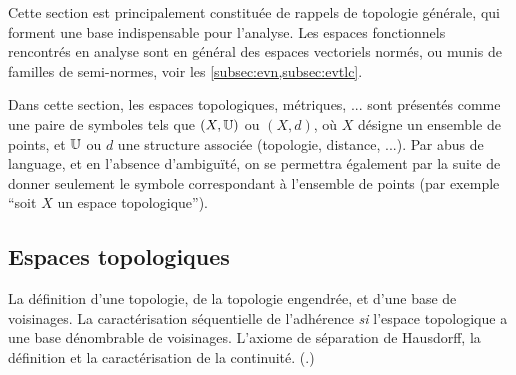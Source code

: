 Cette section est principalement constituée de rappels de topologie générale, qui forment une base indispensable pour l'analyse. Les espaces fonctionnels rencontrés en analyse sont en général des espaces vectoriels normés, ou munis de familles de semi-normes, voir les \cref{subsec:evn,subsec:evtlc}.


\begin{remark}
	Dans cette section, les espaces topologiques, métriques, ... sont présentés comme une paire de symboles tels que $(X,\mathbb{U})$ ou $(X,d)$, où $X$ désigne un ensemble de points, et $\mathbb{U}$ ou $d$ une structure associée (topologie, distance, ...). Par abus de language, et en l'absence d'ambiguïté, on se permettra également par la suite de donner seulement le symbole correspondant à l'ensemble de points (par exemple ``soit $X$ un espace topologique''). 
\end{remark}


\subsection{Espaces topologiques}

\begin{retenir}
La définition d'une topologie, de la topologie engendrée, et d'une base de voisinages. 
La caractérisation séquentielle de l'adhérence \emph{si} l'espace topologique a une base dénombrable de voisinages. 
L'axiome de séparation de Hausdorff, la définition et la caractérisation de la continuité.
(.)
\end{retenir}

